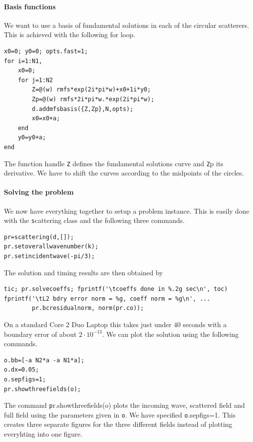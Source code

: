 \paragraph{Basis functions}

We want to use a basis of fundamental solutions in each of the
circular scatterers. This is achieved with the following for loop.
\begin{verbatim}
x0=0; y0=0; opts.fast=1;
for i=1:N1,
    x0=0;
    for j=1:N2
        Z=@(w) rmfs*exp(2i*pi*w)+x0+1i*y0;
        Zp=@(w) rmfs*2i*pi*w.*exp(2i*pi*w);
        d.addmfsbasis({Z,Zp},N,opts);
        x0=x0+a;
    end
    y0=y0+a;
end
\end{verbatim}
The function handle {\texttt Z} defines the fundamental solutions
curve and {\texttt Zp} its derivative. We have to shift the curves
according to the midpoints of the circles.

\paragraph{Solving the problem}
We now have everything together to setup a problem instance.
This is easily done with the {\texttt
  scattering} class and the following three commands.

\begin{verbatim}
pr=scattering(d,[]);
pr.setoverallwavenumber(k);
pr.setincidentwave(-pi/3);
\end{verbatim}

The solution and timing results are then obtained by
\begin{verbatim}
tic; pr.solvecoeffs; fprintf('\tcoeffs done in %.2g sec\n', toc)
fprintf('\tL2 bdry error norm = %g, coeff norm = %g\n', ...
        pr.bcresidualnorm, norm(pr.co));
\end{verbatim}
On a standard Core 2 Duo Laptop this takes just under $40$
seconds with a boundary error of about $2\cdot 10^{-13}$.
We can plot the solution using the following commands.
\begin{verbatim}
o.bb=[-a N2*a -a N1*a];
o.dx=0.05;
o.sepfigs=1;
pr.showthreefields(o);
\end{verbatim}
The command {\texttt pr.showthreefields(o)} plots the incoming wave,
scattered field and full field using the parameters given in {\texttt
  o}. We have specified {\texttt o.sepfigs=1}. This creates three
separate figures for the three different fields instead of plotting
everyhting into one figure.

